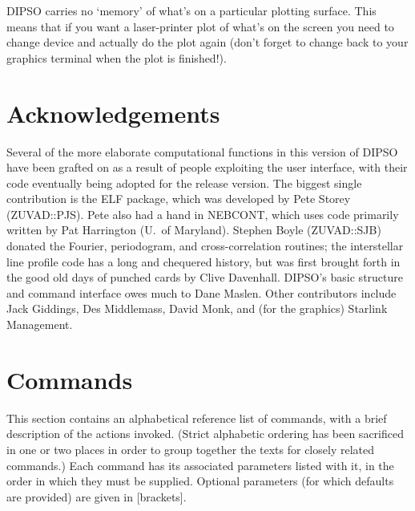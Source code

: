 DIPSO carries no `memory' of what's on a particular plotting surface.
This means that if you want a laser-printer plot of what's on the
screen you need to change device and actually do the plot again (don't
forget to change back to your graphics terminal when the plot is
finished!).

\section {Acknowledgements}

Several of the more elaborate computational functions in this version
of DIPSO have been grafted on as a result of people exploiting the
user interface, with their code eventually being adopted for the
release version. The biggest single contribution is the ELF package,
which was developed by Pete Storey (ZUVAD::PJS). Pete also had a hand
in NEBCONT, which uses code primarily written by Pat Harrington (U.\
of Maryland). Stephen Boyle (ZUVAD::SJB) donated the Fourier,
periodogram, and cross-correlation routines; the interstellar line
profile code has a long and chequered history, but was first brought
forth in the good old days of punched cards by Clive Davenhall.
DIPSO's basic structure and command interface owes much to Dane
Maslen. Other contributors include Jack Giddings, Des Middlemass,
David Monk, and (for the graphics) Starlink Management.

\newpage
\appendix
\section {Commands}

This section contains an alphabetical reference list of commands, with
a brief description of the actions invoked. (Strict alphabetic
ordering has been sacrificed in one or two places in order to group
together the texts for closely related commands.) Each command has its
associated parameters listed with it, in the order in which they must
be supplied. Optional parameters (for which defaults are provided) are
given in [brackets].

